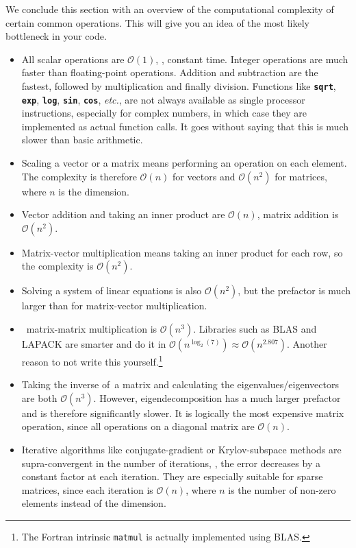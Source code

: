 \documentclass[openany,oneside]{report}
\newcommand{\keyword}[1]{\texttt{\bfseries\color{DarkRed}#1}}
\begin{document}
We conclude this section with an overview of the computational complexity of certain common operations.
This will give you an idea of the most likely bottleneck in your code.
\begin{itemize}
  \item All scalar operations are $\mathcal{O}(1)$, \ie, constant time.
    Integer operations are much faster than floating-point operations.
    Addition and subtraction are the fastest, followed by multiplication and finally division.
    Functions like \keyword{sqrt}, \keyword{exp}, \keyword{log}, \keyword{sin}, \keyword{cos}, \emph{etc.}, are not always available as single processor instructions, especially for complex numbers, in which case they are implemented as actual function calls.
    It goes without saying that this is much slower than basic arithmetic.
  \item Scaling a vector or a matrix means performing an operation on each element.
    The complexity is therefore $\mathcal{O}(n)$ for vectors and $\mathcal{O}\left(n^2\right)$ for matrices, where $n$ is the dimension.
  \item Vector addition and taking an inner product are $\mathcal{O}(n)$, matrix addition is $\mathcal{O}\left(n^2\right)$.
  \item Matrix-vector multiplication means taking an inner product for each row, so the complexity is $\mathcal{O}\left(n^2\right)$.
  \item Solving a system of linear equations is also $\mathcal{O}\left(n^2\right)$, but the prefactor is much larger than for matrix-vector multiplication.
  \item \Naive\ matrix-matrix multiplication is $\mathcal{O}\left(n^3\right)$.
    Libraries such as BLAS and LAPACK are smarter and do it in $\mathcal{O}\left(n^{\log_2(7)}\right)\approx\mathcal{O}\left(n^{2.807}\right)$.
    Another reason to not write this yourself.\footnote{The Fortran intrinsic \texttt{matmul} is actually implemented using BLAS.}
  \item Taking the inverse of\ a matrix and calculating the eigenvalues/eigenvectors are both $\mathcal{O}\left(n^3\right)$.
    However, eigendecomposition has a much larger prefactor and is therefore significantly slower.
    It is logically the most expensive matrix operation, since all operations on a diagonal matrix are $\mathcal{O}(n)$.
  \item Iterative algorithms like conjugate-gradient or Krylov-subspace methods are supra-\linebreak convergent in the number of iterations, \ie, the error decreases by a constant factor at each iteration.
    They are especially suitable for sparse matrices, since each iteration is $\mathcal{O}(n)$, where $n$ is the number of non-zero elements instead of the dimension.
\end{itemize}
\end{document}

